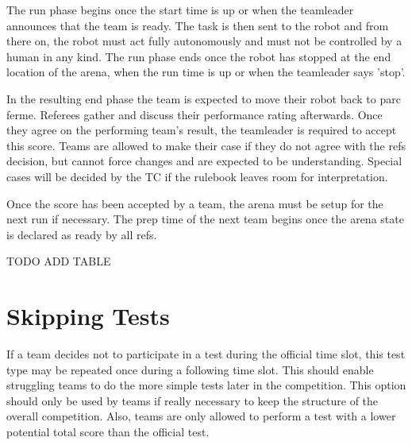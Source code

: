 The run phase begins once the start time is up or when the teamleader announces that the team is ready. 
The task is then sent to the robot and from there on, the robot must act fully autonomously and must not be controlled by a human in any kind.
The run phase ends once the robot has stopped at the end location of the arena, when the run time is up or when the teamleader says 'stop'.

In the resulting end phase the team is expected to move their robot back to parc ferme.
Referees gather and discuss their performance rating afterwards.
Once they agree on the performing team's result, 
the teamleader is required to accept this score. 
Teams are allowed to make their case if they do not agree with the refs decision,
but cannot force changes and are expected to be understanding.
Special cases will be decided by the TC if the rulebook leaves room for interpretation.

Once the score has been accepted by a team,
the arena must be setup for the next run if necessary.
The prep time of the next team begins once the arena state is declared as ready by all refs.

TODO ADD TABLE 

\section{Skipping Tests}

If a team decides not to participate in a test during the official time slot, this test type may be repeated once during a following time slot. This should enable struggling teams to do the more simple tests later in the competition. This option should only be used by teams if really necessary to keep the structure of the overall competition. Also, teams are only allowed to perform a test with a lower potential total score than the official test.

